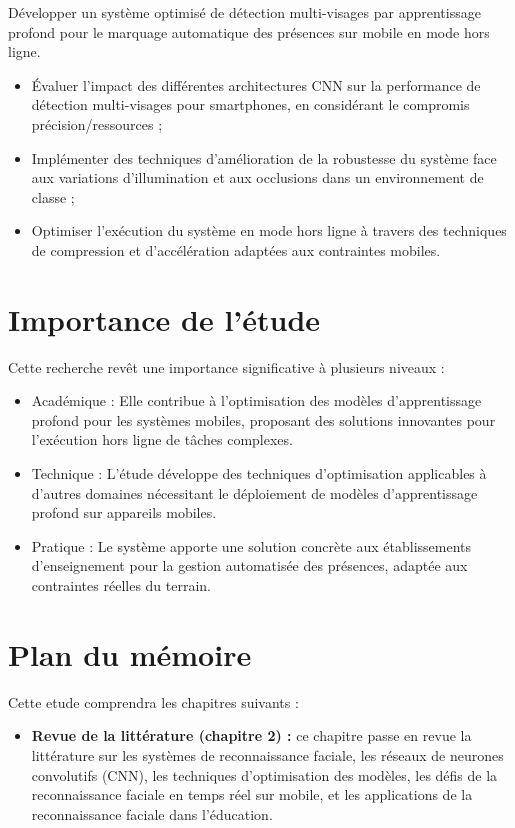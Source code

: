 \begin{onehalfspace}
\hspace{0.65 cm} Développer un système optimisé de détection multi-visages par apprentissage profond pour le marquage automatique des présences sur mobile en mode hors ligne.

\begin{itemize}

    \item Évaluer l'impact des différentes architectures CNN sur la performance de détection multi-visages pour smartphones, en considérant le compromis précision/ressources ;
    \item Implémenter des techniques d'amélioration de la robustesse du système face aux variations d'illumination et aux occlusions dans un environnement de classe ;
    \item Optimiser l'exécution du système en mode hors ligne à travers des techniques de compression et d'accélération adaptées aux contraintes mobiles.
  

\end{itemize}

\section{Importance de l'étude}
Cette recherche revêt une importance significative à plusieurs niveaux :

\begin{itemize}

    \item Académique : Elle contribue à l'optimisation des modèles d'apprentissage profond pour les systèmes mobiles, proposant des solutions innovantes pour l'exécution hors ligne de tâches complexes.
    \item Technique : L'étude développe des techniques d'optimisation applicables à d'autres domaines nécessitant le déploiement de modèles d'apprentissage profond sur appareils mobiles.
    \item  Pratique : Le système apporte une solution concrète aux établissements d'enseignement pour la gestion automatisée des présences, adaptée aux contraintes réelles du terrain.
  

\end{itemize}


\section{Plan du mémoire}
\hspace{0.65 cm} Cette etude comprendra les chapitres suivants :
\begin{itemize}
    \item \textbf{Revue de la littérature (chapitre 2) :} ce chapitre passe en revue la littérature sur les systèmes de reconnaissance faciale, les réseaux de neurones convolutifs (CNN), les techniques d'optimisation des modèles, les défis de la reconnaissance faciale en temps réel sur mobile, et les applications de la reconnaissance faciale dans l'éducation.
    

\end{itemize}
\end{onehalfspace}
